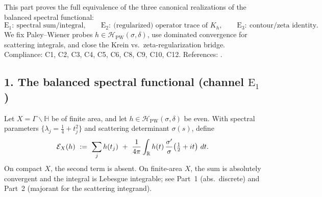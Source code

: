 \noindent
This part proves the full equivalence of the three canonical realizations of the balanced spectral functional: \relax\hspace{0pt}
\[
\mathrm{E}_1:\ \text{spectral sum/integral},\qquad
\mathrm{E}_2:\ \text{(regularized) operator trace of }K_h,\qquad
\mathrm{E}_3:\ \text{contour/zeta identity.}
\]
We fix Paley--Wiener probes $h\in\mathcal{H}_{\mathrm{PW}}(\sigma,\delta)$, use dominated convergence for scattering integrals, and close the Krein vs.\ zeta-regularization bridge. Compliance: C1, C2, C3, C4, C5, C6, C8, C9, C10, C12. References: \cite{HejhalII,IwaniecSpectral,Borthwick,LaxPhillips,Krein,BullaGesztesy}.\relax\hspace{0pt}

\subsection*{1. The balanced spectral functional (channel \texorpdfstring{$\mathrm{E}_1$}{E1})}\relax\hspace{0pt}
\label{subsec:tfc3-E1} %

\begin{definition}\relax\hspace{0pt}
\label{def:tfc3-E1} %
Let $X=\Gamma\backslash\mathbb{H}$ be of finite area, and let $h\in\mathcal{H}_{\mathrm{PW}}(\sigma,\delta)$ be even. With spectral parameters $\{\lambda_j=\tfrac14+t_j^2\}$ and scattering determinant $\sigma(s)$, define
\begin{equation}\relax\hspace{0pt}
\label{eq:tfc3-E1}\relax\hspace{0pt}
\mathcal{E}_X(h)\ :=\ \sum_{j} h(t_j)\ +\ \frac{1}{4\pi}\int_{\mathbb{R}} h(t)\,\frac{\sigma'}{\sigma}\!\left(\tfrac12+it\right)\,dt.
\end{equation}
On compact $X$, the second term is absent. On finite-area $X$, the sum is absolutely convergent and the integral is Lebesgue integrable; see Part~1 (abs.\ discrete) and Part~2 (majorant for the scattering integrand).\relax\hspace{0pt}
\end{definition}


